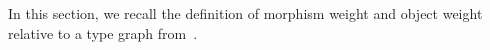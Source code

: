 In this section, we recall the definition of morphism weight and object weight relative to a type graph from~\cite{endrullis2024generalized_icgt}.

